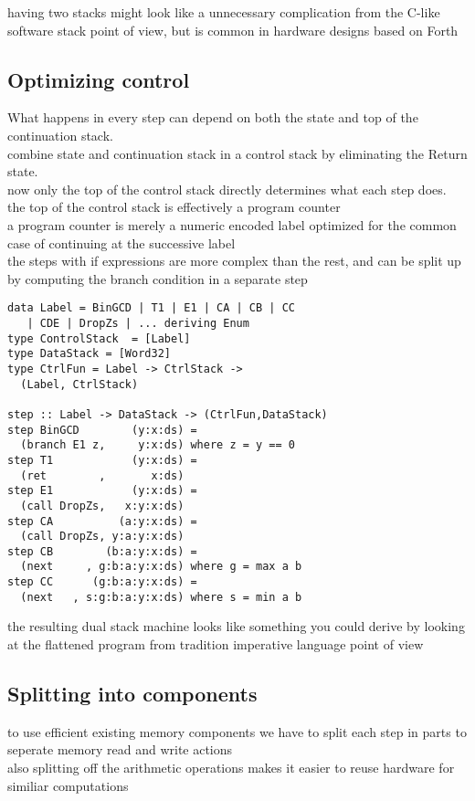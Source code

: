 \documentclass[preprint]{sigplanconf}
\begin{document}
having two stacks might look like a unnecessary complication from the C-like software stack point of view, but is common in hardware designs based on Forth \cite{LaForest}

\subsection{Optimizing control}

What happens in every step can depend on both the state and top of the continuation stack. \\
combine state and continuation stack in a control stack by eliminating the Return state. \\
now only the top of the control stack directly determines what each step does. \\
the top of the control stack is effectively a program counter \\
a program counter is merely a numeric encoded label optimized for the common case of continuing at the successive label \\
the steps with if expressions are more complex than the rest, and can be split up by computing the branch condition in a separate step

\begin{lstlisting}
data Label = BinGCD | T1 | E1 | CA | CB | CC
   | CDE | DropZs | ... deriving Enum
type ControlStack  = [Label]
type DataStack = [Word32]
type CtrlFun = Label -> CtrlStack -> 
  (Label, CtrlStack)

step :: Label -> DataStack -> (CtrlFun,DataStack)
step BinGCD        (y:x:ds) =
  (branch E1 z,     y:x:ds) where z = y == 0
step T1            (y:x:ds) = 
  (ret        ,       x:ds)
step E1            (y:x:ds) = 
  (call DropZs,   x:y:x:ds)
step CA          (a:y:x:ds) = 
  (call DropZs, y:a:y:x:ds)
step CB        (b:a:y:x:ds) = 
  (next     , g:b:a:y:x:ds) where g = max a b
step CC      (g:b:a:y:x:ds) = 
  (next   , s:g:b:a:y:x:ds) where s = min a b
\end{lstlisting}

the resulting dual stack machine looks like something you could derive by looking at the flattened program from tradition imperative language point of view

\subsection{Splitting into components}

to use efficient existing memory components we have to split each step in parts to seperate memory read and write actions \\
also splitting off the arithmetic operations makes it easier to reuse hardware for similiar computations
\end{document}
